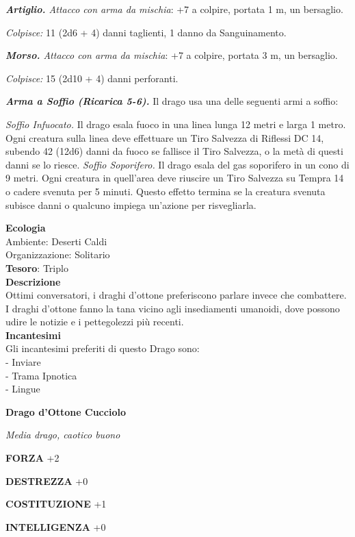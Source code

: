 \begin{multicols}{2}
\textit{\textbf{Artiglio.} Attacco con arma da mischia}: +7 a colpire, portata 1 m, un bersaglio.

\textit{Colpisce:} 11 (2d6 + 4) danni taglienti, 1 danno da Sanguinamento.

\textit{\textbf{Morso.} Attacco con arma da mischia}: +7 a colpire, portata 3 m, un bersaglio.

\textit{Colpisce:} 15 (2d10 + 4) danni perforanti.

\textit{\textbf{Arma a Soffio (Ricarica 5-6).}} Il drago usa una delle seguenti armi a soffio:

\textit{Soffio Infuocato.} Il drago esala fuoco in una linea lunga 12 metri e larga 1 metro. Ogni creatura sulla linea deve effettuare un Tiro Salvezza di Riflessi DC 14, subendo 42 (12d6) danni da fuoco se fallisce il Tiro Salvezza, o la metà di questi danni se lo riesce. \textit{Soffio Soporifero.} Il drago esala del gas soporifero in un cono di 9 metri. Ogni creatura in quell'area deve riuscire un Tiro Salvezza su Tempra 14 o cadere svenuta per 5 minuti. Questo effetto termina se la creatura svenuta subisce danni o qualcuno impiega un'azione per risvegliarla.

\textbf{Ecologia}\\
Ambiente: Deserti Caldi\\
Organizzazione: Solitario\\
\textbf{Tesoro}: Triplo\\
\textbf{Descrizione}\\
Ottimi conversatori, i draghi d'ottone preferiscono parlare invece che combattere. I draghi d'ottone fanno la tana vicino agli insediamenti umanoidi, dove possono udire le notizie e i pettegolezzi più recenti.\\
\textbf{Incantesimi}\\
Gli incantesimi preferiti di questo Drago sono:\\
- Inviare\\
- Trama Ipnotica\\
- Lingue

\medskip{}\textbf{Drago d'Ottone Cucciolo}

\textit{Media drago, caotico buono}

\textbf{FORZA} +2

\textbf{DESTREZZA} +0

\textbf{COSTITUZIONE} +1

\textbf{INTELLIGENZA} +0


\end{multicols}
